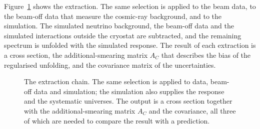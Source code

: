 \documentclass[11pt,a4paper]{article}
\begin{document}
Figure~\ref{fig:chain} shows the extraction. The same selection is applied to the beam data, to
the beam-off data that measure the cosmic-ray background, and to the simulation. The simulated
neutrino background, the beam-off data and the simulated interactions outside the cryostat are
subtracted, and the remaining spectrum is unfolded with the simulated response. The result of each
extraction is a cross section, the additional-smearing matrix $A_C$ that describes the bias of the
regularised unfolding, and the covariance matrix of the uncertainties.

\begin{figure}[H]
  \centering
  \caption{The extraction chain. The same selection is applied to data, beam-off data and
    simulation; the simulation also supplies the response and the systematic universes. The output
    is a cross section together with the additional-smearing matrix $A_C$ and the covariance, all
    three of which are needed to compare the result with a prediction.}
  \label{fig:chain}
\end{figure}
\end{document}
